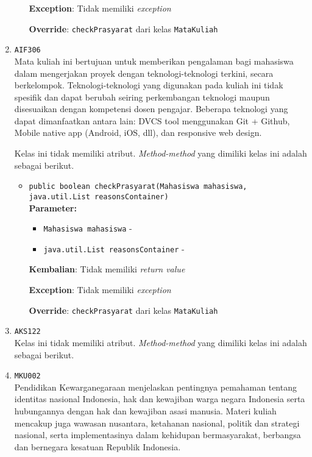 \documentclass{article}
\begin{document}
\begin{enumerate}
\begin{itemize}
\textbf{Exception}: Tidak memiliki \textit{exception}

\textbf{Override}: \texttt{checkPrasyarat} dari kelas \texttt{MataKuliah}

\end{itemize}
\item \texttt{AIF306}\\ 
Mata kuliah ini bertujuan untuk memberikan pengalaman bagi mahasiswa dalam
 mengerjakan proyek dengan teknologi-teknologi terkini, secara berkelompok.
 Teknologi-teknologi yang digunakan pada kuliah ini tidak spesifik dan dapat
 berubah seiring perkembangan teknologi maupun disesuaikan dengan kompetensi
 dosen pengajar. Beberapa teknologi yang dapat dimanfaatkan antara lain: DVCS
 tool menggunakan Git + Github, Mobile native app (Android, iOS, dll), dan
 responsive web design.

Kelas ini tidak memiliki atribut. \textit{Method-method} yang dimiliki kelas ini adalah sebagai berikut.
\begin{itemize}
\item \texttt{public boolean checkPrasyarat(Mahasiswa mahasiswa, java.util.List reasonsContainer)}\\ 


\textbf{Parameter:}\begin{itemize}
\item \texttt{Mahasiswa mahasiswa} - 
\item \texttt{java.util.List reasonsContainer} - 
\end{itemize}
\textbf{Kembalian}: Tidak memiliki \textit{return value}

\textbf{Exception}: Tidak memiliki \textit{exception}

\textbf{Override}: \texttt{checkPrasyarat} dari kelas \texttt{MataKuliah}

\end{itemize}
\item \texttt{AKS122}\\ 
Kelas ini tidak memiliki atribut. \textit{Method-method} yang dimiliki kelas ini adalah sebagai berikut.
\begin{itemize}
\end{itemize}
\item \texttt{MKU002}\\ 
Pendidikan Kewarganegaraan menjelaskan pentingnya pemahaman tentang identitas nasional 
 Indonesia, hak dan kewajiban warga negara Indonesia serta hubungannya dengan hak dan 
 kewajiban asasi manusia. Materi kuliah mencakup juga wawasan nusantara, ketahanan nasional, 
 politik dan strategi nasional, serta implementasinya dalam kehidupan bermasyarakat, berbangsa 
 dan bernegara kesatuan Republik Indonesia.


\end{enumerate}
\end{document}
